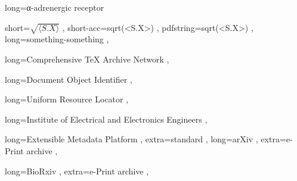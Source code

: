  {long=α-adrenergic receptor}

 {
    short=$\sqrt{\langle S . X \rangle }$ ,
    short-acc=sqrt(<S.X>) ,
    pdfstring=sqrt(<S.X>) ,
    long=something-something ,
}


 {
    long=Comprehensive TeX Archive Network ,
}

 {
    long=Document Object Identifier ,
}

 {
    long=Uniform Resource Locator ,
}

 {
    long=Institute of Electrical and Electronics Engineers ,
}

 {
    long=Extensible Metadata Platform ,
    extra=standard ,
}
 {
    long=arXiv ,
    extra=e-Print archive ,
}

 {
    long=BioRxiv ,
    extra=e-Print archive ,
}
